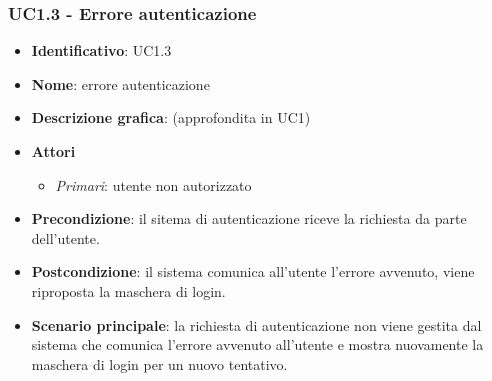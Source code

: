 \subsubsection{UC1.3 - Errore autenticazione}
\begin{itemize}
  \item \textbf{Identificativo}: UC1.3
  \item \textbf{Nome}: errore autenticazione
  \item \textbf{Descrizione grafica}: (approfondita in UC1)
  \item \textbf{Attori}
        \begin{itemize}
          \item \textit{Primari}: utente non autorizzato
        \end{itemize}
  \item \textbf{Precondizione}: il sitema di autenticazione riceve la richiesta da parte dell'utente.
  \item \textbf{Postcondizione}: il sistema comunica all'utente l'errore avvenuto, viene riproposta la maschera di login.
  \item \textbf{Scenario principale}: la richiesta di autenticazione non viene gestita dal sistema che comunica l'errore avvenuto all'utente e mostra nuovamente la maschera di login per un nuovo tentativo.
\end{itemize}